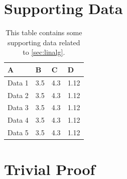 \section{Supporting Data}
\lipsum[1]
\begin{table}[htb]
  \centering
  \caption{This table contains some supporting data related to
    \cref{sec:linalg}.}
  \label{tab:supp}
  \begin{tabular}{llll}
    \toprule
    A      & B   & C   & D    \\
    \midrule
    Data 1 & 3.5 & 4.3 & 1.12 \\
    Data 2 & 3.5 & 4.3 & 1.12 \\
    Data 3 & 3.5 & 4.3 & 1.12 \\
    Data 4 & 3.5 & 4.3 & 1.12 \\
    Data 5 & 3.5 & 4.3 & 1.12 \\
    \bottomrule
  \end{tabular}
\end{table}

\section{Trivial Proof}
\lipsum[2-6]
